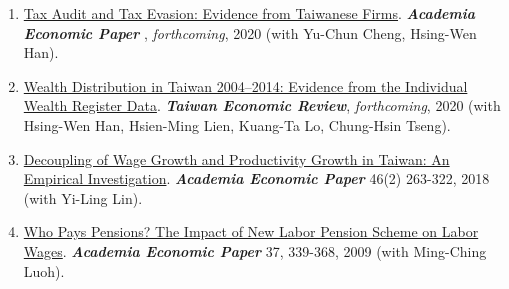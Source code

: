 \documentclass[10pt,letterpaper]{article}
\renewenvironment{itemize}{
  \begin{list}{}{
      \setlength{\leftmargin}{1.5em}
      \setlength{\itemsep}{0.25em}
      \setlength{\parskip}{0pt}
      \setlength{\parsep}{0.25em}
    }
}{
  \end{list}
}
\begin{document}
\begin{enumerate}
\item
\href{https://www.dropbox.com/s/z5b267cu72o6xlg/tot_wage_v63_olo_revised.pdf?dl=0}{Tax Audit and Tax Evasion: Evidence from Taiwanese Firms}. \textit{\textbf{Academia Economic Paper }}, \textit{forthcoming}, 2020 (with Yu-Chun Cheng, Hsing-Wen Han).


\item
\href{http://www.econ.ntu.edu.tw/ter/new/data/new/forthcoming/108-015.pdf}{Wealth Distribution in Taiwan 2004–2014: Evidence from the Individual Wealth Register Data}. \textit{\textbf{Taiwan Economic Review}}, \textit{forthcoming}, 2020 (with Hsing-Wen Han, Hsien-Ming Lien, Kuang-Ta Lo, Chung-Hsin Tseng).

\item
\href{https://www.dropbox.com/s/z5b267cu72o6xlg/tot_wage_v63_olo_revised.pdf?dl=0}{Decoupling of Wage Growth and Productivity Growth in Taiwan: An Empirical Investigation}. \textit{\textbf{Academia Economic Paper}} 46(2) 263-322, 2018 (with Yi-Ling Lin).   
\item \href{http://www.econ.sinica.edu.tw/UpFiles/2013090214141704234/Periodicals_Pdf2013090215152407682/aep37-3-3.pdf}{Who Pays Pensions? The Impact of New Labor Pension Scheme on Labor Wages}.
  \textit{\textbf{Academia Economic Paper}} 37, 339-368, 2009 (with Ming-Ching Luoh).



\end{enumerate}





\end{document}

